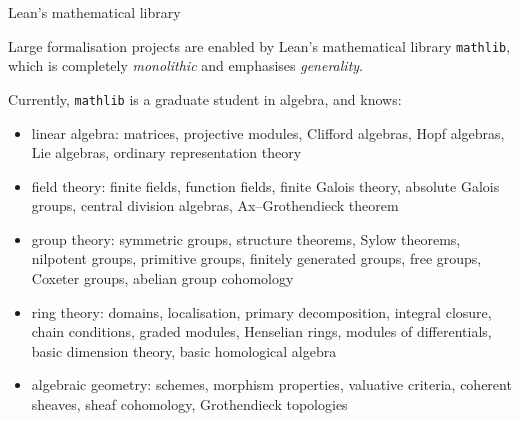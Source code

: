 \documentclass[10pt]{beamer}
\begin{document}
\begin{frame}[t]{Lean's mathematical library}

Large formalisation projects are enabled by Lean's mathematical library \texttt{mathlib}, which is completely \emph{monolithic} and emphasises \emph{generality}.

\pause

\vspace{0.5cm} Currently, \texttt{mathlib} is a graduate student in algebra, and knows:
\begin{itemize}
\item linear algebra: matrices, projective modules, Clifford algebras, Hopf algebras, Lie algebras, ordinary representation theory

\pause

\item field theory: finite fields, function fields, finite Galois theory, absolute Galois groups, central division algebras, Ax--Grothendieck theorem

\pause

\item group theory: symmetric groups, structure theorems, Sylow theorems, nilpotent groups, primitive groups, finitely generated groups, free groups, Coxeter groups, abelian group cohomology

\pause

\item ring theory: domains, localisation, primary decomposition, integral closure, chain conditions, graded modules, Henselian rings, modules of differentials, basic dimension theory, basic homological algebra

\pause

\item algebraic geometry: schemes, morphism properties, valuative criteria, coherent sheaves, sheaf cohomology, Grothendieck topologies
\end{itemize}

\end{frame}
\end{document}
